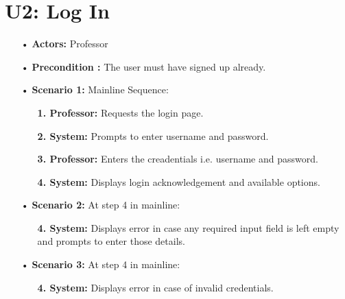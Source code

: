 \documentclass{scrreprt}
\begin{document}
\section{U2: Log In}
\begin{itemize}
\item[•]
\textbf{Actors:} Professor
\item[•] \textbf{Precondition :} The user must have signed up already.
\item[•]
\textbf{Scenario 1:} Mainline Sequence:
\begin{itemize}
  \item [] \textbf{1. Professor:} Requests the login page.
  \item [] \textbf{2. System:} Prompts to enter username and password.
  \item [] \textbf{3. Professor:} Enters the creadentials i.e. username and password.
  \item [] \textbf{4. System:} Displays login acknowledgement and available options.
  \end{itemize}
\item[•]
\textbf{Scenario 2:} At step 4 in mainline:
\begin{itemize}
  \item [] \textbf{4. System:} Displays error in case any required input field is left empty and prompts to enter those details.
  \end{itemize}
\item[•]
\textbf{Scenario 3:} At step 4 in mainline:
\begin{itemize}
  \item [] \textbf{4. System:} Displays error in case of invalid credentials.
  \end{itemize}
\end{itemize}
\end{document}
